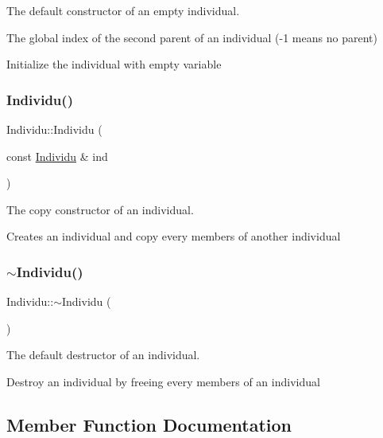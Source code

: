 The default constructor of an empty individual. 

The global index of the second parent of an individual (-\/1 means no parent)

Initialize the individual with empty variable \mbox{\label{class_individu_a73c8148ec030d8b008c4a60a62738198}} 
\subsubsection{\texorpdfstring{Individu()}{Individu()}\hspace{0.1cm}{\footnotesize\ttfamily [2/2]}}
{\footnotesize\ttfamily Individu\+::\+Individu (\begin{DoxyParamCaption}\item[{const \hyperlink{class_individu}{Individu} \&}]{ind }\end{DoxyParamCaption})}



The copy constructor of an individual. 

Creates an individual and copy every members of another individual \mbox{\label{class_individu_a84dcf2842927993d6c9ab833dfb6997a}} 
\subsubsection{\texorpdfstring{$\sim$\+Individu()}{~Individu()}}
{\footnotesize\ttfamily Individu\+::$\sim$\+Individu (\begin{DoxyParamCaption}{ }\end{DoxyParamCaption})}



The default destructor of an individual. 

Destroy an individual by freeing every members of an individual 

\subsection{Member Function Documentation}
\mbox{\label{class_individu_aaf98484035ad3c9d41cf12013a5c65fd}} 
